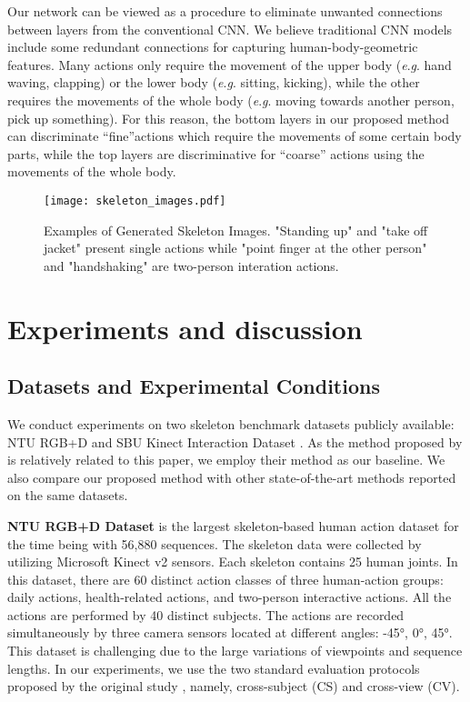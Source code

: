 \documentclass{bmvc2k}
\begin{document}
Our network can be viewed as a procedure to eliminate unwanted connections between layers from the conventional CNN. We believe traditional CNN models include some redundant connections for capturing human-body-geometric features. Many actions only require the movement of the upper body ({\textit{e}.\textit{g}.} hand waving, clapping) or the lower body ({\textit{e}.\textit{g}.} sitting, kicking), while the other requires the movements of the whole body ({\textit{e}.\textit{g}.} moving towards another person, pick up something). For this reason, the bottom layers in our proposed method can discriminate ``fine''actions which require the movements of some certain body parts, while the top layers are discriminative for ``coarse'' actions using the movements of the whole body.

\begin{figure}[t!]
	\centering
	\texttt{[image: skeleton\_images.pdf]}
	\caption{Examples of Generated Skeleton Images. "Standing up" and "take off jacket" present single actions while "point finger at the other person" and "handshaking" are two-person interation actions.}
	\label{fig:skeleton_images}
\end{figure}
    
\section{Experiments and discussion}
	\label{sec:exps}
\subsection{Datasets and Experimental Conditions}
\hspace*{1.25em}
We conduct experiments on two skeleton benchmark datasets publicly available: NTU RGB+D \cite{shahroudy2016ntu} and SBU Kinect Interaction Dataset \cite{yun2012two}. As the method proposed by \cite{ke2017skeletonnet} is relatively related to this paper, we employ their method as our baseline. We also compare our proposed method with other state-of-the-art methods reported on the same datasets.

\textbf{NTU RGB+D Dataset}
is the largest skeleton-based human action dataset for the time being with 56,880 sequences. The skeleton data were collected by utilizing Microsoft Kinect v2 sensors. Each skeleton contains 25 human joints. In this dataset, there are 60 distinct action classes of three human-action groups: daily actions, health-related actions, and two-person interactive actions. All the actions are performed by 40 distinct subjects. The actions are recorded simultaneously by three camera sensors located at different angles: \ang{-45}, \ang{0}, \ang{45}. This dataset is challenging due to the large variations of viewpoints and sequence lengths.
In our experiments, we use the two standard evaluation protocols proposed by the original study \cite{shahroudy2016ntu}, namely, cross-subject (CS) and cross-view (CV).
\end{document}
